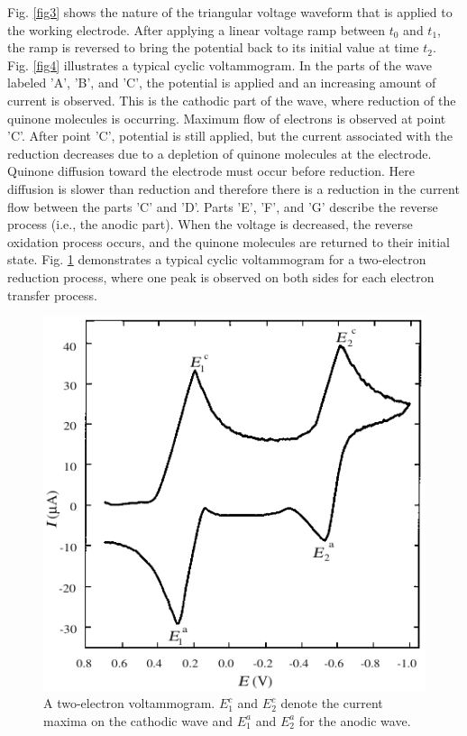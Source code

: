 \documentclass[byrevtex,amssymb,aps,pra,floatfix,letterpaper]{revtex4}
\begin{document}
Fig. \ref{fig3} shows the nature of the triangular voltage waveform that is applied to the working electrode. After applying a linear voltage ramp between $t_0$ and $t_1$, the ramp is reversed to bring the potential back to its initial value at time $t_2$. Fig. \ref{fig4} illustrates a typical cyclic voltammogram. In the parts of the wave labeled 'A', 'B', and 'C', the potential is applied and an increasing amount of current is observed. This is the cathodic part of the
wave, where reduction of the quinone molecules is occurring. Maximum flow of electrons is observed at point 'C'. After point 'C', potential is still applied, but the current associated with the reduction decreases due to a depletion of quinone molecules at the electrode. Quinone diffusion toward the electrode must occur before reduction. Here diffusion is slower than reduction and therefore there is a reduction in the current flow between the parts 'C' and 'D'. Parts 'E', 'F', and 'G' describe the reverse process (i.e., the anodic part). When the voltage is decreased, the reverse oxidation process occurs, and the quinone molecules are returned to their initial state. Fig. \ref{fig5} demonstrates a typical cyclic voltammogram for a two-electron reduction process, where one peak is observed
on both sides for each electron transfer process.

\begin{figure}[!htp]
\begin{center}
\includegraphics[scale=0.4]{voltammogram2}
\caption{A two-electron voltammogram. $E_1^c$ and $E_2^c$ denote the current maxima on the cathodic wave and $E_1^a$ and $E_2^a$ for the anodic wave.}
\label{fig5}
\end{center}
\end{figure}
\end{document}

